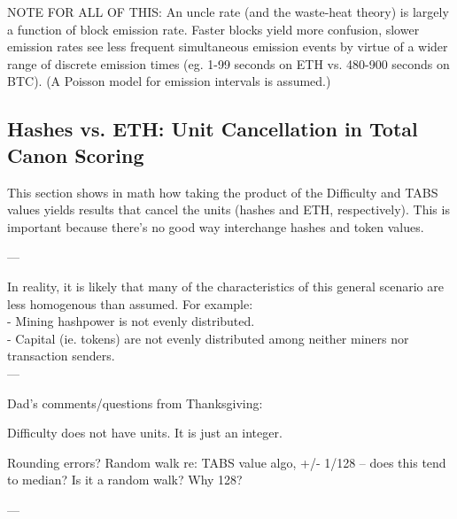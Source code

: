 \documentclass[11pt]{article}
\theoremstyle{plain}
\begin{document}
NOTE FOR ALL OF THIS:
An uncle rate (and the waste-heat theory) is largely a function of block
emission rate.
Faster blocks yield more confusion, slower emission rates see less frequent
simultaneous emission events by virtue of a wider range of discrete emission
times (eg. 1-99 seconds on ETH vs. 480-900 seconds on BTC). (A Poisson model
for emission intervals is assumed.)



\subsection{\small{Hashes vs. ETH: Unit Cancellation in Total Canon
Scoring}}

This section shows in math how taking the product of the Difficulty and TABS
values
yields results that cancel the units (hashes and ETH, respectively). This is
important because there's no good way interchange hashes and token values.

---

In reality, it is likely that many of the characteristics of this general
scenario are less homogenous than assumed.
For example: \\
- Mining hashpower is not evenly distributed. \\
- Capital (ie. tokens) are not evenly distributed among neither miners nor
transaction senders. \\

---

Dad's comments/questions from Thanksgiving:

Difficulty does not have units. It is just an integer.

Rounding errors?
Random walk re: TABS value algo, +/- 1/128 -- does this tend to median? Is it a
random walk?
Why 128?

---
\end{document}
